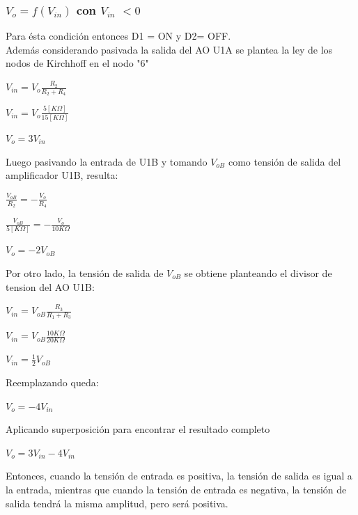 \documentclass[11pt, a4paper]{article}
\begin{document}
\subsubsection{$V_o = f(V_{in})$ con $V_{in}$ $< 0$  }
Para ésta condición entonces D1 = ON y D2= OFF. \\
Además considerando pasivada la salida del AO U1A se plantea la ley de los nodos de Kirchhoff en el nodo "6"
\begin{center}
	$V_{in} = V_o \frac{R_2}{R_2 + R_4}$
\end{center}
\begin{center}
	$V_{in} = V_o \frac{5[K\Omega]}{15[K\Omega]}$
\end{center}
\begin{center}
	$V_o= 3 V_{in}$
\end{center}
Luego pasivando la entrada de U1B y tomando $V_{oB}$ como tensión de salida del amplificador U1B, resulta:
\begin{center}
	$\frac{V_{oB}}{R_2} =- \frac{V_o}{R_4}$
\end{center}
\begin{center}
	$\frac{V_{oB}}{5[K\Omega]} =- \frac{V_o}{10K\Omega}$
\end{center}
\begin{center}
	$V_o = -2 V_{oB} $
\end{center}
Por otro lado, la tensión de salida de $V_{oB}$ se obtiene planteando el divisor de tension del AO U1B:
\begin{center}
	$V_{in} = V_{oB} \frac{R_3}{R_1 + R_3}$
\end{center}
\begin{center}
	$V_{in} = V_{oB} \frac{10K\Omega}{20K\Omega}$
\end{center}
\begin{center}
	$V_{in} =\frac{1}{2} V_{oB} $
\end{center}
Reemplazando queda:
\begin{center}
	$V_o = -4 V_{in} $
\end{center}
Aplicando superposición para encontrar el resultado completo
\begin{center}
	$V_o = 3 V_{in} - 4 V_{in}$
\end{center}
\begin{center}
\end{center}
Entonces, cuando la tensión de entrada es positiva, la tensión de salida es igual a la entrada, mientras que cuando la tensión de entrada es negativa, la tensión de salida tendrá la misma amplitud, pero será positiva.
\newpage
\end{document}
